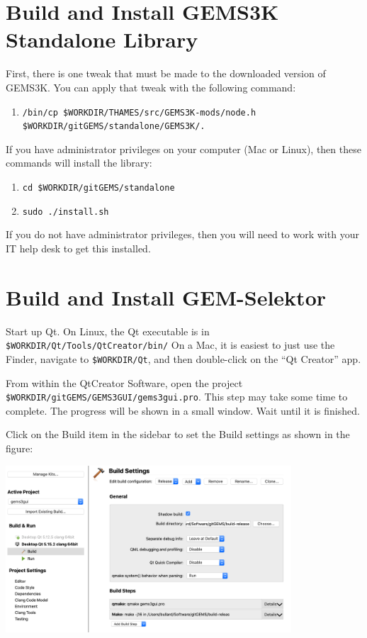 \documentclass{article}
\begin{document}
\section{Build and Install GEMS3K Standalone Library}
First, there is one tweak that must be made to the downloaded version of GEMS3K.
You can apply that tweak with the following command:
\begin{enumerate}
    \item \verb!/bin/cp $WORKDIR/THAMES/src/GEMS3K-mods/node.h $WORKDIR/gitGEMS/standalone/GEMS3K/.!
\end{enumerate}

If you have administrator privileges on your computer (Mac or Linux), then these commands
will install the library:
\begin{enumerate}
        \item \verb!cd $WORKDIR/gitGEMS/standalone!
        \item \verb!sudo ./install.sh!
\end{enumerate}
If you do not have administrator privileges, then you will need to work with your IT
help desk to get this installed.

\section{Build and Install GEM-Selektor}
Start up Qt.  On Linux, the Qt executable is in \verb!$WORKDIR/Qt/Tools/QtCreator/bin/!
On a Mac, it is easiest to just use the Finder, navigate to \verb!$WORKDIR/Qt!, and then
double-click on the ``Qt Creator'' app.

From within the QtCreator Software, open the project \verb!$WORKDIR/gitGEMS/GEMS3GUI/gems3gui.pro!.
This step may take some time to complete.  The progress will be shown in a small window.  Wait
until it is finished.

Click on the Build item in the sidebar to set the Build settings as shown in the figure:

\begin{center}
    \includegraphics[width=0.8\textwidth]{Figures/Qt-build-settings.png}
\end{center}
\end{document}
